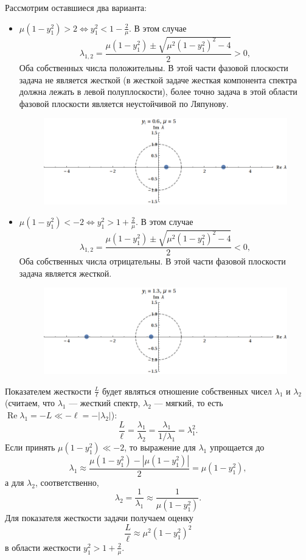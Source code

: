 \documentclass[12pt]{article}
\begin{document}
Рассмотрим оставшиеся два варианта:
\begin{itemize}
\item $\mu(1 - y_1^2) > 2 \Leftrightarrow y_1^2 < 1 - \frac{2}{\mu}$. В этом случае
\[
\lambda_{1,2} = \frac{\mu(1 - y_1^2) \pm \sqrt{\mu^2 (1 - y_1^2)^2 - 4}}{2} > 0,
\]
Оба собственных числа положительны. В этой части фазовой плоскости задача не является жесткой (в жесткой задаче жесткая компонента спектра должна лежать в левой полуплоскости), более точно задача в этой области фазовой плоскости является неустойчивой по Ляпунову.
\begin{figure}[ht!]
\centering
\includegraphics[width=\textwidth]{lamunst.png}
\end{figure}
\item $\mu(1 - y_1^2) < -2 \Leftrightarrow y_1^2 > 1 + \frac{2}{\mu}$. В этом случае
\[
\lambda_{1,2} = \frac{\mu(1 - y_1^2) \pm \sqrt{\mu^2 (1 - y_1^2)^2 - 4}}{2} < 0,
\]
Оба собственных числа отрицательны. В этой части фазовой плоскости задача является жесткой. \begin{figure}[ht!]
\centering
\includegraphics[width=\textwidth]{lamst.png}
\end{figure}
\end{itemize}
Показателем жесткости $\frac{L}{\ell}$ будет являться отношение собственных чисел $\lambda_1$ и $\lambda_2$ (считаем, что $\lambda_1$ --- жесткий спектр, $\lambda_2$ --- мягкий, то есть $\operatorname{Re} \lambda_1 = -L \ll -\ell = -|\lambda_2|$):
\[
\frac{L}{\ell} = \frac{\lambda_1}{\lambda_2} = 
\frac{\lambda_1}{1 / \lambda_1} = \lambda_1^2.
\]
Если принять $\mu (1 - y_1^2) \ll -2$, то выражение для $\lambda_1$ упрощается до
\[
\lambda_1 \approx \frac{\mu(1 - y_1^2) - |\mu(1 - y_1^2)|}{2} = \mu(1 - y_1^2),
\]
а для $\lambda_2$, соответственно,
\[
\lambda_2 = \frac{1}{\lambda_1} \approx \frac{1}{\mu(1 - y_1^2)}.
\]
Для показателя жесткости задачи получаем оценку
\[
\frac{L}{\ell} \approx \mu^2 (1 - y_1^2)^2
\]
в области жесткости $y_1^2 > 1 + \frac{2}{\mu}$.
\end{document}
